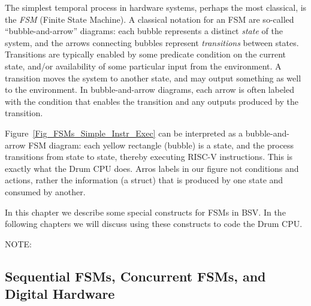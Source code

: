 The simplest temporal process in hardware systems, perhaps the most
classical, is the \emph{FSM} (Finite State Machine).  A classical
notation for an FSM are so-called ``bubble-and-arrow'' diagrams: each
bubble represents a distinct \emph{state} of the system, and the
arrows connecting bubbles represent \emph{transitions} between states.
Transitions are typically enabled by some predicate condition on the
current state, and/or availability of some particular input from the
environment.  A transition moves the system to another state, and may
output something as well to the environment.  In bubble-and-arrow
diagrams, each arrow is often labeled with the condition that enables
the transition and any outputs produced by the transition.


Figure~\ref{Fig_FSMs_Simple_Instr_Exec} can be interpreted as a
bubble-and-arrow FSM diagram: each yellow rectangle (bubble) is a
state, and the process transitions from state to state, thereby
executing RISC-V instructions.  This is exactly what the Drum CPU
does.  Arros labels in our figure not conditions and actions, rather
the information (a struct) that is produced by one state and consumed
by another.

In this chapter we describe some special constructs for FSMs in BSV.
In the following chapters we will discuss using these constructs to
code the Drum CPU.

\vspace{2ex}

NOTE:


\subsection{Sequential FSMs, Concurrent FSMs, and Digital Hardware}


